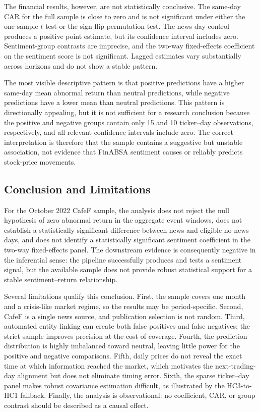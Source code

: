 The financial results, however, are not statistically conclusive. The same-day CAR for the full sample is close to zero and is not significant under either the one-sample $t$-test or the sign-flip permutation test. The news-day control produces a positive point estimate, but its confidence interval includes zero. Sentiment-group contrasts are imprecise, and the two-way fixed-effects coefficient on the sentiment score is not significant. Lagged estimates vary substantially across horizons and do not show a stable pattern.

The most visible descriptive pattern is that positive predictions have a higher same-day mean abnormal return than neutral predictions, while negative predictions have a lower mean than neutral predictions. This pattern is directionally appealing, but it is not sufficient for a research conclusion because the positive and negative groups contain only 15 and 10 ticker--day observations, respectively, and all relevant confidence intervals include zero. The correct interpretation is therefore that the sample contains a suggestive but unstable association, not evidence that FinABSA sentiment causes or reliably predicts stock-price movements.

\subsection{Conclusion and Limitations}
\label{subsec:validation-conclusion}

For the October 2022 CafeF sample, the analysis does not reject the null hypothesis of zero abnormal return in the aggregate event windows, does not establish a statistically significant difference between news and eligible no-news days, and does not identify a statistically significant sentiment coefficient in the two-way fixed-effects panel. The downstream evidence is consequently negative in the inferential sense: the pipeline successfully produces and tests a sentiment signal, but the available sample does not provide robust statistical support for a stable sentiment--return relationship.

Several limitations qualify this conclusion. First, the sample covers one month and a crisis-like market regime, so the results may be period-specific. Second, CafeF is a single news source, and publication selection is not random. Third, automated entity linking can create both false positives and false negatives; the strict sample improves precision at the cost of coverage. Fourth, the prediction distribution is highly imbalanced toward neutral, leaving little power for the positive and negative comparisons. Fifth, daily prices do not reveal the exact time at which information reached the market, which motivates the next-trading-day alignment but does not eliminate timing error. Sixth, the sparse ticker--day panel makes robust covariance estimation difficult, as illustrated by the HC3-to-HC1 fallback. Finally, the analysis is observational: no coefficient, CAR, or group contrast should be described as a causal effect.

